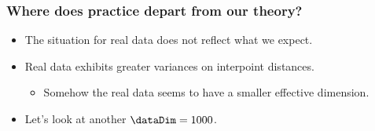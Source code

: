 \begin{frame}
  \frametitle{Where does practice depart from our theory?}
  \begin{itemize}
  \item The situation for real data does not reflect what we expect.
  \item Real data exhibits greater variances on interpoint distances.

    \begin{itemize}
    \item Somehow the real data seems to have a smaller effective dimension.
    \end{itemize}
  \item Let's look at another $\dataDim=1000$.
  \end{itemize}

\end{frame}

